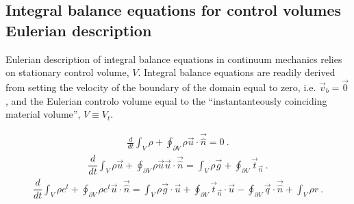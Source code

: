 \documentclass[letterpaper,10pt,english]{jupyterBook}
\begin{document}
\subsection{Integral balance equations for control volumes \sphinxhyphen{} Eulerian description}
\label{\detokenize{ch/continuum/balance-primary-integral:integral-balance-equations-for-control-volumes-eulerian-description}}\label{\detokenize{ch/continuum/balance-primary-integral:continuum-governing-equations-primary-integral-euler}}
\sphinxAtStartPar
Eulerian description of integral balance equations in continuum mechanics relies on stationary control volume, \(V\). Integral balance equations are readily derived from {\hyperref[\detokenize{ch/continuum/balance-primary-integral:continuum-governing-equations-primary-integral-arbitrary}]{}} setting the velocity of the boundary of the domain equal to zero, i.e. \(\vec{v}_b = \vec{0}\), and the Eulerian controlo volume equal to the “instantanteously coinciding material volume”, \(V \equiv V_t\).

\sphinxAtStartPar
{}
\begin{equation*}
\begin{split}\frac{d}{dt} \int_{V} \rho + \oint_{\partial V} \rho \vec{u} \cdot \vec{\hat{n}} = 0 \ .\end{split}
\end{equation*}
\sphinxAtStartPar
{}
\begin{equation*}
\begin{split}\dfrac{d}{dt} \int_{V} \rho \vec{u} + \oint_{\partial V} \rho \vec{u} \vec{u} \cdot \vec{\hat{n}} = \int_{V} \rho \vec{g} + \oint_{\partial V} \vec{t}_{\vec{n}} \ .\end{split}
\end{equation*}
\sphinxAtStartPar
{}
\begin{equation*}
\begin{split}\dfrac{d}{dt} \int_{V} \rho e^t + \oint_{\partial V} \rho e^t \vec{u} \cdot \vec{\hat{n}} = \int_{V} \rho \vec{g} \cdot \vec{u} + \oint_{\partial V} \vec{t}_{\vec{n}} \cdot \vec{u} - \oint_{\partial V} \vec{q} \cdot \vec{\hat{n}} + \int_{V} \rho r \ .\end{split}
\end{equation*}
\sphinxstepscope
\end{document}
